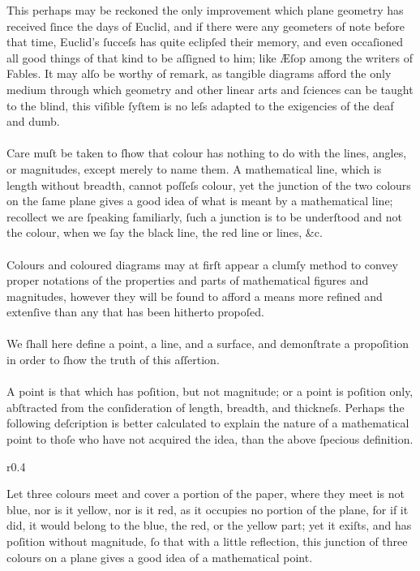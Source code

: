 This perhaps may be reckoned the only improvement which plane geometry has received ſince the days of Euclid, and if there were any geometers of note before that time, Euclid’s ſucceſs has quite eclipſed their memory, and even occaſioned all good things of that kind to be aſſigned to him; like Æſop among the writers of Fables. It may alſo be worthy of remark, as tangible diagrams afford the only medium through which geometry and other linear arts and ſciences can be taught to the blind, this viſible ſyſtem is no leſs adapted to the exigencies of the deaf and dumb.\\
\hfill\\
Care muſt be taken to ſhow that colour has nothing to do with the lines, angles, or magnitudes, except merely to name them.  A mathematical line, which is length without breadth, cannot poſſeſs colour, yet the junction of the two colours on the ſame plane gives a good idea of what is meant by a mathematical line; recollect we are ſpeaking familiarly, ſuch a junction is to be underſtood and not the colour, when we ſay the black line, the red line or lines, \&c.\\
\hfill\\
Colours and coloured diagrams may at firſt appear a clumſy method to convey proper notations of the properties and parts of mathematical figures and magnitudes, however they will be found to afford a means more refined and extenſive than any that has been hitherto propoſed.\\
\hfill\\
We ſhall here define a point, a line, and a surface, and demonſtrate a propoſition in order to ſhow the truth of this aſſertion.\\
\hfill\\
A point is that which has poſition, but not magnitude; or a point is poſition only, abſtracted from the conſideration of length, breadth, and thickneſs. Perhaps the following deſcription is better calculated to explain the nature of a mathematical point to thoſe who have not acquired the idea, than the above ſpecious definition.\\
\begin{wrapfigure}{r}{0.4\textwidth}
    \centering
    
\end{wrapfigure}
Let three colours meet and cover a portion of the paper, where they meet is not blue, nor is it yellow, nor is it red, as it occupies no portion of the plane, for if it did, it would belong to the blue, the red, or the yellow part;
yet it exiſts, and has poſition without magnitude, ſo that with a little reflection, this junction of three colours on a plane gives a good idea of a mathematical point.\\

